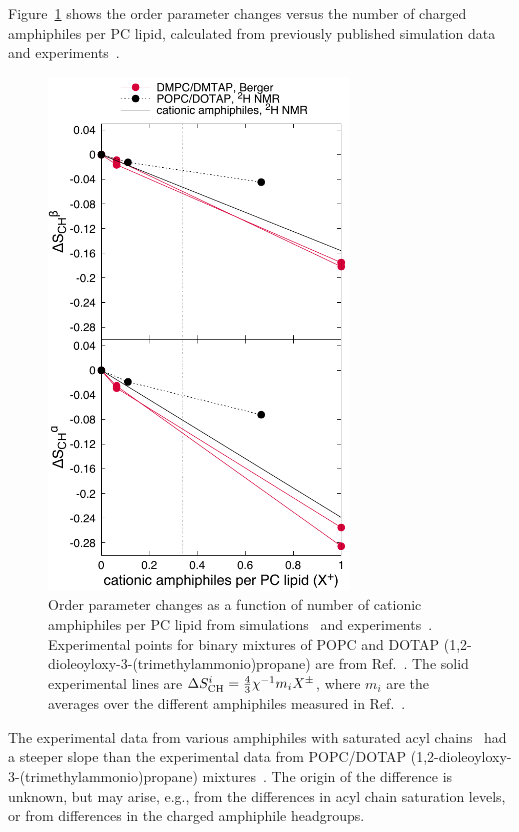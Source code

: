 \documentclass[twoside,twocolumn,9pt]{article}
\begin{document}
Figure~\ref{DMPC_DMTAP} shows the order parameter changes versus
the number of charged amphiphiles per PC lipid, calculated from previously published simulation 
data~\cite{miettinen09,DMPC_DMTAP0mol,DMPC_DMTAP6mol,DMPC_DMTAP50mol} and
experiments~\cite{scherer89,franzin98}.
\begin{figure}[t]
  \centering
  \includegraphics[width=8cm]{../Fig/OrderParameterDMPC_DMTAP.pdf} 
  \caption{\label{DMPC_DMTAP}
    Order parameter changes as a function of number of cationic amphiphiles per PC lipid from simulations~\cite{miettinen09,DMPC_DMTAP0mol,DMPC_DMTAP6mol,DMPC_DMTAP50mol} 
    and experiments~\cite{scherer89,franzin98}. Experimental points for binary mixtures of POPC and DOTAP (1,2-dioleoyloxy-3-(trimethylammonio)propane)
    are from Ref.~. The solid experimental lines are $\Delta S_{\rm{CH}}^{i}=\frac{4}{3}\chi^{-1}m_i X^\pm$, where $m_i$ are the averages
    over the different amphiphiles measured in Ref.~.
}
\end{figure}
The experimental data from various amphiphiles with saturated acyl chains~\cite{scherer89} had a
steeper slope than the experimental data from POPC/DOTAP (1,2-dioleoyloxy-3-(trimethylammonio)propane) mixtures~\cite{franzin98}.
The origin of the difference is unknown, but may arise, e.g., from the differences in acyl chain saturation levels, or from differences in the charged amphiphile headgroups.
\end{document}
